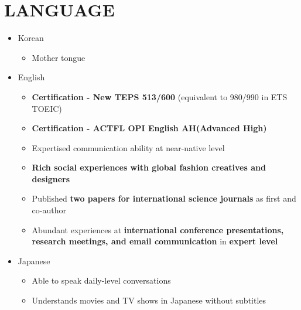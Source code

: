 \documentclass[a4paper,10pt]{extarticle}
\begin{document}

\section*{LANGUAGE}
\begin{itemize}
    \item Korean
          \begin{itemize}
              \item Mother tongue
          \end{itemize}
    \item English
          \begin{itemize}
              \item \textbf{Certification - New TEPS 513/600} (equivalent to 980/990 in ETS TOEIC)
              \item \textbf{Certification - ACTFL OPI English AH(Advanced High)}
              \item Expertised communication ability at near-native level
              \item \textbf{Rich social experiences with global fashion creatives and designers}
              \item Published \textbf{two papers for international science journals} as first and co-author
              \item Abundant experiences at \textbf{international conference presentations, research meetings, and email communication} in \textbf{expert level}
          \end{itemize}
    \item Japanese
          \begin{itemize}
              \item Able to speak daily-level conversations
              \item Understands movies and TV shows in Japanese without subtitles
          \end{itemize}
\end{itemize}
\end{document}
